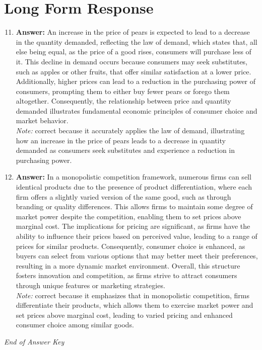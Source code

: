 \documentclass[12pt]{article}
\begin{document}
\section*{Long Form Response}
\begin{enumerate}[label=\arabic*.]
\setcounter{enumi}{10}
\item \textbf{Answer:} An increase in the price of pears is expected to lead to a decrease in the quantity demanded, reflecting the law of demand, which states that, all else being equal, as the price of a good rises, consumers will purchase less of it. This decline in demand occurs because consumers may seek substitutes, such as apples or other fruits, that offer similar satisfaction at a lower price. Additionally, higher prices can lead to a reduction in the purchasing power of consumers, prompting them to either buy fewer pears or forego them altogether. Consequently, the relationship between price and quantity demanded illustrates fundamental economic principles of consumer choice and market behavior.
\\ \textit{Note:} correct because it accurately applies the law of demand, illustrating how an increase in the price of pears leads to a decrease in quantity demanded as consumers seek substitutes and experience a reduction in purchasing power.
\item \textbf{Answer:} In a monopolistic competition framework, numerous firms can sell identical products due to the presence of product differentiation, where each firm offers a slightly varied version of the same good, such as through branding or quality differences. This allows firms to maintain some degree of market power despite the competition, enabling them to set prices above marginal cost. The implications for pricing are significant, as firms have the ability to influence their prices based on perceived value, leading to a range of prices for similar products. Consequently, consumer choice is enhanced, as buyers can select from various options that may better meet their preferences, resulting in a more dynamic market environment. Overall, this structure fosters innovation and competition, as firms strive to attract consumers through unique features or marketing strategies.
\\ \textit{Note:} correct because it emphasizes that in monopolistic competition, firms differentiate their products, which allows them to exercise market power and set prices above marginal cost, leading to varied pricing and enhanced consumer choice among similar goods.
\end{enumerate}

\vfill
\noindent\textit{End of Answer Key}
\end{document}
